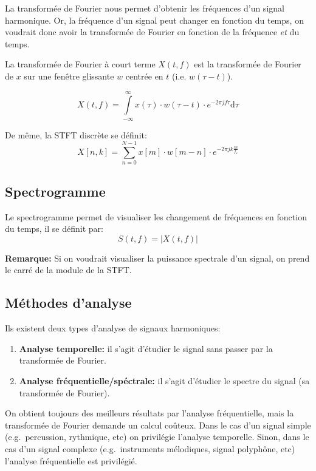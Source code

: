 \documentclass[french,]{article}
\providecommand{\tightlist}{%
  \setlength{\itemsep}{0pt}\setlength{\parskip}{0pt}}
\begin{document}
La transformée de Fourier nous permet d'obtenir les fréquences d'un
signal harmonique. Or, la fréquence d'un signal peut changer en fonction
du temps, on voudrait donc avoir la transformée de Fourier en fonction
de la fréquence \emph{et} du temps.

La transformée de Fourier à court terme \(X(t,f)\) est la transformée de
Fourier de \(x\) sur une fenêtre glissante \(w\) centrée en \(t\) (i.e.
\(w(\tau-t)\)).

\[X(t, f) = \int\limits_{-\infty}^{\infty} x(\tau)\cdot w(\tau-t)\cdot e^{-2\pi j f\tau} \mathrm{d}\tau \]

De même, la STFT discrète se définit:
\[X[n, k] = \sum\limits_{n=0}^{N-1} x[m]\cdot w[m-n]\cdot e^{-2\pi j k \frac{m}{f_s}}\]

\hypertarget{spectrogramme}{%
\subsection{Spectrogramme}\label{spectrogramme}}

Le spectrogramme permet de visualiser les changement de fréquences en
fonction du temps, il se définit par:
\[ S(t,f) = \left\lvert X(t,f) \right\rvert \]

\textbf{Remarque:} Si on voudrait visualiser la puissance spectrale d'un
signal, on prend le carré de la module de la STFT.

\hypertarget{methodes-danalyse}{%
\subsection{Méthodes d'analyse}\label{methodes-danalyse}}

Ils existent deux types d'analyse de signaux harmoniques:

\begin{enumerate}
\def\labelenumi{\arabic{enumi}.}
\tightlist
\item
  \textbf{Analyse temporelle:} il s'agit d'étudier le signal sans passer
  par la transformée de Fourier.
\item
  \textbf{Analyse fréquentielle/spéctrale:} il s'agit d'étudier le
  spectre du signal (sa transformée de Fourier).
\end{enumerate}

On obtient toujours des meilleurs résultats par l'analyse fréquentielle,
mais la transformée de Fourier demande un calcul coûteux. Dans le cas
d'un signal simple (e.g.~percussion, rythmique, etc) on privilégie
l'analyse temporelle. Sinon, dans le cas d'un signal complexe
(e.g.~instruments mélodiques, signal polyphône, etc) l'analyse
fréquentielle est privilégié.
\end{document}
